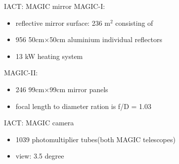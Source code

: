 \documentclass{beamer}
\begin{document}
\begin{frame}{IACT: MAGIC mirror}
    MAGIC-I:
	\begin{itemize}
        \item reflective mirror surface: 236 $\text{m}^2$ consisting of
        \item 956 50cm×50cm aluminium individual reflectors
        \item 13 kW heating system
    \end{itemize}
    \hfill \break
    MAGIC-II:
    \begin{itemize}
        \item 246 99cm×99cm mirror panels
        \item focal length to diameter ration is f/D = 1.03
    \end{itemize}

    \begin{figure}
        \centering
        \qquad
    \end{figure}
\end{frame}


\begin{frame}{IACT: MAGIC camera}
    \begin{itemize}
        \item 1039 photomultiplier tubes(both MAGIC telescopes)
        \item view: 3.5 degree
    \end{itemize}

    \begin{figure}
        \centering
        \qquad
    \end{figure}
\end{frame}
\end{document}
